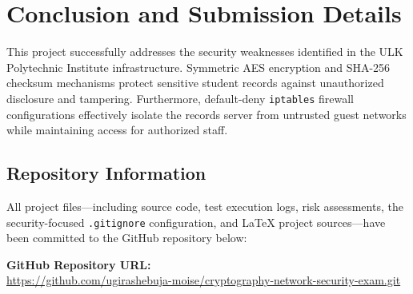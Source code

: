 \documentclass[12pt,a4paper]{article}
\begin{document}
\section{Conclusion and Submission Details}

This project successfully addresses the security weaknesses identified in the ULK Polytechnic Institute infrastructure. Symmetric AES encryption and SHA-256 checksum mechanisms protect sensitive student records against unauthorized disclosure and tampering. Furthermore, default-deny \texttt{iptables} firewall configurations effectively isolate the records server from untrusted guest networks while maintaining access for authorized staff.

\subsection{Repository Information}
All project files—including source code, test execution logs, risk assessments, the security-focused \texttt{.gitignore} configuration, and LaTeX project sources—have been committed to the GitHub repository below:

\begin{center}
\textbf{GitHub Repository URL:}\\
\url{https://github.com/ugirashebuja-moise/cryptography-network-security-exam.git}
\end{center}
\end{document}
